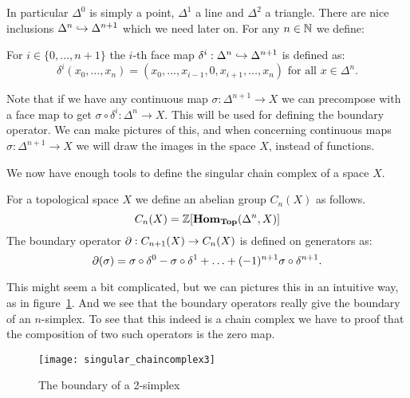 In particular $\Delta^0$ is simply a point, $\Delta^1$ a line and $\Delta^2$ a triangle. There are nice inclusions $\Delta^n \hookrightarrow \Delta^{n+1}$ which we need later on. For any $n \in \mathbb{N}$ we define:
\begin{definition}
	For $i \in \{0, \ldots, n+1\}$ the $i$-th face map $\delta^i : \Delta^n \hookrightarrow \Delta^{n+1}$ is defined as:
	$$ \delta^i (x_0, \ldots, x_n) = (x_0, \ldots, x_{i-1}, 0, x_{i+1}, \ldots, x_n) \text{ for all } x \in \Delta^n.$$
\end{definition}

Note that if we have any continuous map $\sigma : \Delta^{n+1} \to X$ we can precompose with a face map to get $\sigma \circ \delta^i : \Delta^n \to X$. This will be used for defining the boundary operator. We can make pictures of this, and when concerning continuous maps $\sigma : \Delta^{n+1} \to X$ we will draw the images in the space $X$, instead of functions.



We now have enough tools to define the singular chain complex of a space $X$.

\begin{definition}
	For a topological space $X$ we define an abelian group $C_n(X)$ as follows.
	$$ C_n(X) = \mathbb{Z}[\mathbf{Hom}_{\mathbf{Top}}(\Delta^n, X)] $$
	The boundary operator $\partial : C_{n+1}(X) \to C_n(X)$ is defined on generators as:
	$$ \partial(\sigma) = \sigma \circ \delta^0 - \sigma \circ \delta^1 + \ldots + (-1)^{n+1} \sigma \circ \delta^{n+1}.$$
\end{definition}

This might seem a bit complicated, but we can pictures this in an intuitive way, as in figure~\ref{fig:singular_chaincomplex3}. And we see that the boundary operators really give the boundary of an $n$-simplex. To see that this indeed is a chain complex we have to proof that the composition of two such operators is the zero map.
\begin{figure}
	\texttt{[image: singular\_chaincomplex3]}
	\caption{The boundary of a 2-simplex}
	\label{fig:singular_chaincomplex3}
\end{figure}



